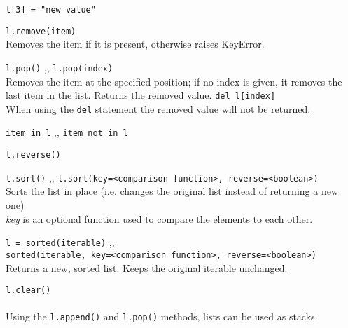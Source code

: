 \begin{itemize}
         \texttt{l[3] = "new value"}

         \texttt{l.remove(item)} \\
        Removes the item if it is present, otherwise raises KeyError.

        \begin{itemize}
             \texttt{l.pop()} \sep{,}
            \texttt{l.pop(index)} \\
            Removes the item at the specified position; if no index is given, it removes the last
            item in the list. Returns the removed value.
             \texttt{del l[index]} \\
            When using the \texttt{del} statement the removed value will not be
            returned.
        \end{itemize}


         \texttt{item in l} \sep{,}
        \texttt{item not in l}

         \texttt{l.reverse()}

         \texttt{l.sort()} \sep{,}
        \texttt{l.sort(key=<comparison function>, reverse=<boolean>)} \\
        Sorts the list in place (i.e. changes the original list instead of returning a new one)\\
        \textit{key} is an optional function used to compare the elements to each other.

         \texttt{l = sorted(iterable)} \sep{,} \\
        \texttt{sorted(iterable, key=<comparison function>, reverse=<boolean>)} \\
        Returns a new, sorted list. Keeps the original iterable unchanged.

         \texttt{l.clear()}
        \\ \\
        Using the \texttt{l.append()} and \texttt{l.pop()} methods, lists
        can be used as stacks

        \end{itemize}

